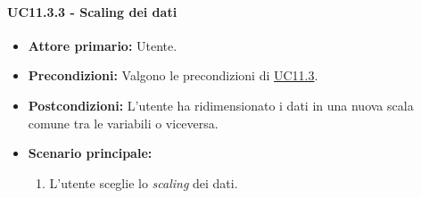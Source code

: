 \paragraph{UC11.3.3 - Scaling dei dati}
\label{sec:UC11.3.3}
    \begin{itemize}
        \item \textbf{Attore primario:} Utente.
        \item \textbf{Precondizioni:} Valgono le precondizioni di \hyperref[sec:UC11.3]{UC11.3}.
	    \item \textbf{Postcondizioni:} L'utente ha ridimensionato i dati in una nuova scala comune tra le variabili o viceversa.
	    \item \textbf{Scenario principale:} 
	    \begin{enumerate}
	    		\item L'utente sceglie lo \textit{scaling} dei dati.
		\end{enumerate}
    \end{itemize}

\newpage

